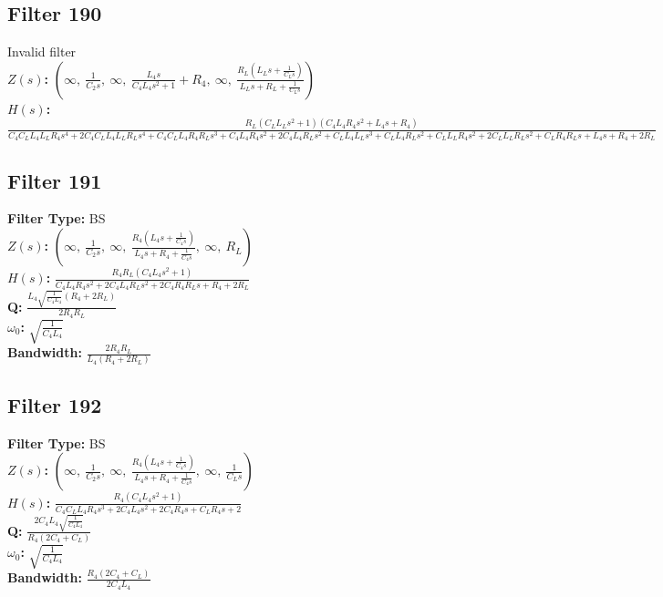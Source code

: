 \documentclass{article}
\begin{document}
\subsection*{Filter 190}
Invalid filter \\ 
\textbf{$Z(s)$:} $\left( \infty, \  \frac{1}{C_{2} s}, \  \infty, \  \frac{L_{4} s}{C_{4} L_{4} s^{2} + 1} + R_{4}, \  \infty, \  \frac{R_{L} \left(L_{L} s + \frac{1}{C_{L} s}\right)}{L_{L} s + R_{L} + \frac{1}{C_{L} s}}\right)$ \\ 
\textbf{$H(s)$:} $\frac{R_{L} \left(C_{L} L_{L} s^{2} + 1\right) \left(C_{4} L_{4} R_{4} s^{2} + L_{4} s + R_{4}\right)}{C_{4} C_{L} L_{4} L_{L} R_{4} s^{4} + 2 C_{4} C_{L} L_{4} L_{L} R_{L} s^{4} + C_{4} C_{L} L_{4} R_{4} R_{L} s^{3} + C_{4} L_{4} R_{4} s^{2} + 2 C_{4} L_{4} R_{L} s^{2} + C_{L} L_{4} L_{L} s^{3} + C_{L} L_{4} R_{L} s^{2} + C_{L} L_{L} R_{4} s^{2} + 2 C_{L} L_{L} R_{L} s^{2} + C_{L} R_{4} R_{L} s + L_{4} s + R_{4} + 2 R_{L}}$ \\ 
\subsection*{Filter 191}
\textbf{Filter Type:} BS \\ 
\textbf{$Z(s)$:} $\left( \infty, \  \frac{1}{C_{2} s}, \  \infty, \  \frac{R_{4} \left(L_{4} s + \frac{1}{C_{4} s}\right)}{L_{4} s + R_{4} + \frac{1}{C_{4} s}}, \  \infty, \  R_{L}\right)$ \\ 
\textbf{$H(s)$:} $\frac{R_{4} R_{L} \left(C_{4} L_{4} s^{2} + 1\right)}{C_{4} L_{4} R_{4} s^{2} + 2 C_{4} L_{4} R_{L} s^{2} + 2 C_{4} R_{4} R_{L} s + R_{4} + 2 R_{L}}$ \\ 
\textbf{Q:} $\frac{L_{4} \sqrt{\frac{1}{C_{4} L_{4}}} \left(R_{4} + 2 R_{L}\right)}{2 R_{4} R_{L}}$ \\ 
\textbf{$\omega_0$:} $\sqrt{\frac{1}{C_{4} L_{4}}}$ \\ 
\textbf{Bandwidth:} $\frac{2 R_{4} R_{L}}{L_{4} \left(R_{4} + 2 R_{L}\right)}$ \\ 
\subsection*{Filter 192}
\textbf{Filter Type:} BS \\ 
\textbf{$Z(s)$:} $\left( \infty, \  \frac{1}{C_{2} s}, \  \infty, \  \frac{R_{4} \left(L_{4} s + \frac{1}{C_{4} s}\right)}{L_{4} s + R_{4} + \frac{1}{C_{4} s}}, \  \infty, \  \frac{1}{C_{L} s}\right)$ \\ 
\textbf{$H(s)$:} $\frac{R_{4} \left(C_{4} L_{4} s^{2} + 1\right)}{C_{4} C_{L} L_{4} R_{4} s^{3} + 2 C_{4} L_{4} s^{2} + 2 C_{4} R_{4} s + C_{L} R_{4} s + 2}$ \\ 
\textbf{Q:} $\frac{2 C_{4} L_{4} \sqrt{\frac{1}{C_{4} L_{4}}}}{R_{4} \left(2 C_{4} + C_{L}\right)}$ \\ 
\textbf{$\omega_0$:} $\sqrt{\frac{1}{C_{4} L_{4}}}$ \\ 
\textbf{Bandwidth:} $\frac{R_{4} \left(2 C_{4} + C_{L}\right)}{2 C_{4} L_{4}}$ \\ 
\end{document}
